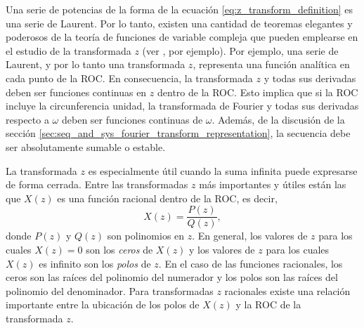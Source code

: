 \documentclass[a4paper]{report}
\begin{document}
Una serie de potencias de la forma de la ecuación \ref{eq:z_transform_definition} es una serie de Laurent. Por lo tanto, existen una cantidad de teoremas elegantes y poderosos de la teoría de funciones de variable compleja que pueden emplearse en el estudio de la transformada \(z\) (ver \cite{brown2013complex}, por ejemplo). Por ejemplo, una serie de Laurent, y por lo tanto una transformada \(z\), representa una función analítica en cada punto de la ROC. En consecuencia, la transformada \(z\) y todas sus derivadas deben ser funciones continuas en \(z\) dentro de la ROC. Esto implica que si la ROC incluye la circunferencia unidad, la transformada de Fourier y todas sus derivadas respecto a \(\omega\) deben ser funciones continuas de \(\omega\). Además, de la discusión de la sección \ref{sec:seq_and_sys_fourier_transform_representation}, la secuencia debe ser absolutamente sumable o estable.

La transformada \(z\) es especialmente útil cuando la suma infinita puede expresarse de forma cerrada. Entre las transformadas \(z\) más importantes y útiles están las que \(X(z)\) es una función racional dentro de la ROC, es decir,
\[
 X(z)=\frac{P(z)}{Q(z)},
\]
donde \(P(z)\) y \(Q(z)\) son polinomios en \(z\). En general, los valores de \(z\) para los cuales \(X(z)=0\) son los \emph{ceros} de \(X(z)\) y los valores de \(z\) para los cuales \(X(z)\) es infinito son los \emph{polos} de \(z\). En el caso de las funciones racionales, los ceros son las raíces del polinomio del numerador y los polos son las raíces del polinomio del denominador. Para transformadas \(z\) racionales existe una relación importante entre la ubicación de los polos de \(X(z)\) y la ROC de la transformada \(z\).
\end{document}
